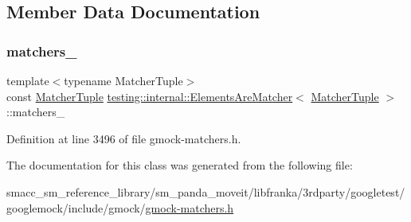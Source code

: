 \subsection{Member Data Documentation}
\mbox{\label{classtesting_1_1internal_1_1ElementsAreMatcher_a3e7acc958d30ad5303e8e126d2d1c11e}} 
\subsubsection{\texorpdfstring{matchers\+\_\+}{matchers\_}}
{\footnotesize\ttfamily template$<$typename Matcher\+Tuple$>$ \\
const \hyperlink{structtesting_1_1internal_1_1MatcherTuple}{Matcher\+Tuple} \hyperlink{classtesting_1_1internal_1_1ElementsAreMatcher}{testing\+::internal\+::\+Elements\+Are\+Matcher}$<$ \hyperlink{structtesting_1_1internal_1_1MatcherTuple}{Matcher\+Tuple} $>$\+::matchers\+\_\+\hspace{0.3cm}{\ttfamily [private]}}



Definition at line 3496 of file gmock-\/matchers.\+h.



The documentation for this class was generated from the following file\+:\begin{DoxyCompactItemize}
\item 
smacc\+\_\+sm\+\_\+reference\+\_\+library/sm\+\_\+panda\+\_\+moveit/libfranka/3rdparty/googletest/googlemock/include/gmock/\hyperlink{gmock-matchers_8h}{gmock-\/matchers.\+h}\end{DoxyCompactItemize}
